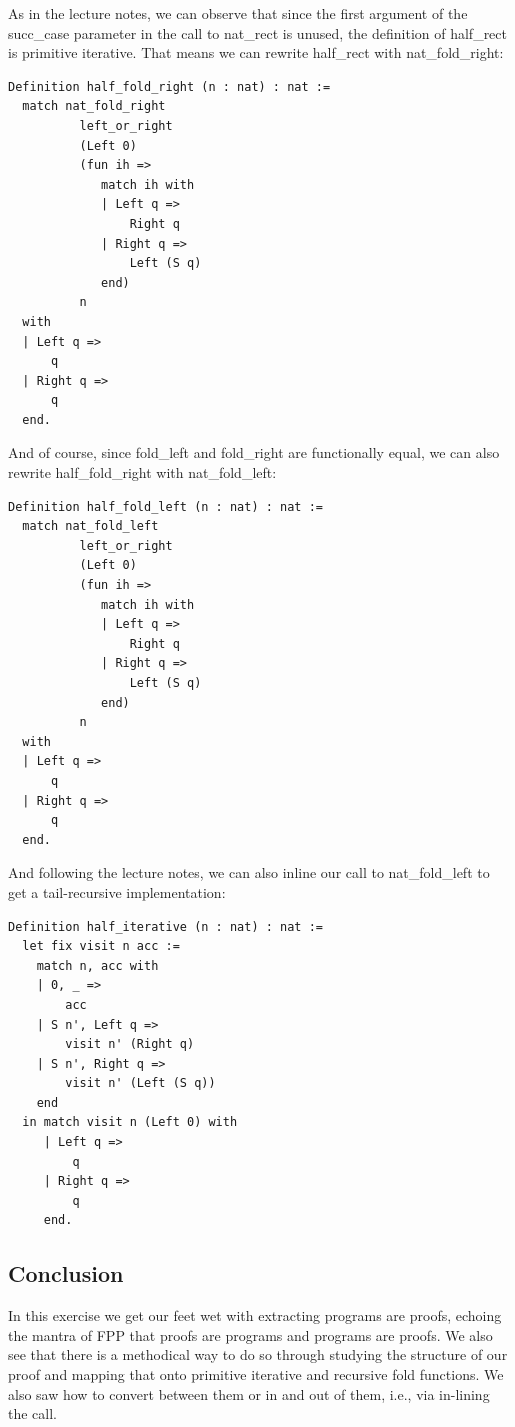 \documentclass{article}
\begin{document}
As in the lecture notes, we can observe that since the first argument of the succ\_case parameter in the call to nat\_rect is unused, the definition of half\_rect is primitive iterative. That means we can rewrite half\_rect with nat\_fold\_right:

\begin{lstlisting}
Definition half_fold_right (n : nat) : nat :=
  match nat_fold_right
          left_or_right
          (Left 0)
          (fun ih =>                   
             match ih with
             | Left q =>
                 Right q          
             | Right q =>
                 Left (S q)
             end)
          n
  with
  | Left q =>
      q
  | Right q =>
      q
  end.
\end{lstlisting}

And of course, since fold\_left and fold\_right are functionally equal, we can also rewrite half\_fold\_right with nat\_fold\_left:

\begin{lstlisting}
Definition half_fold_left (n : nat) : nat :=
  match nat_fold_left
          left_or_right
          (Left 0)
          (fun ih =>                   
             match ih with
             | Left q =>
                 Right q          
             | Right q =>
                 Left (S q)
             end)
          n
  with
  | Left q =>
      q
  | Right q =>
      q
  end.
\end{lstlisting}

And following the lecture notes, we can also inline our call to nat\_fold\_left to get a tail-recursive implementation:

\begin{lstlisting}
Definition half_iterative (n : nat) : nat :=
  let fix visit n acc :=
    match n, acc with
    | 0, _ =>
        acc
    | S n', Left q =>
        visit n' (Right q)
    | S n', Right q =>
        visit n' (Left (S q))
    end
  in match visit n (Left 0) with
     | Left q =>
         q
     | Right q =>
         q
     end.
\end{lstlisting}
 
\subsection{Conclusion}

In this exercise we get our feet wet with extracting programs are proofs, echoing the mantra of FPP that proofs are programs and programs are proofs. We also see that there is a methodical way to do so through studying the structure of our proof and mapping that onto primitive iterative and recursive fold functions. We also saw how to convert between them or in and out of them, i.e., via in-lining the call.
 
\end{document}
